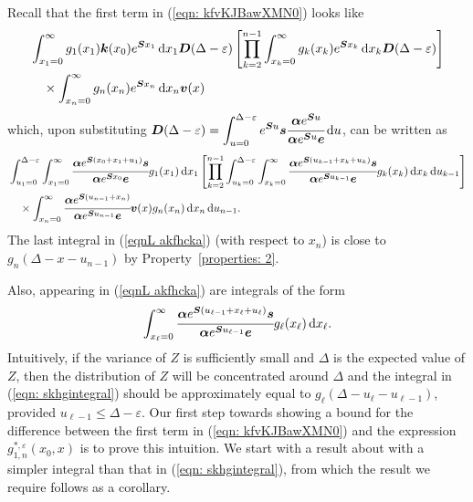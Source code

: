 	Recall that the first term in (\ref{eqn: kfvKJBawXMN0}) looks like 
	\begin{align}
		&\int_{x_1=0}^\infty g_1(x_1) \boldsymbol k(x_0)e^{\boldsymbol{S}x_1}\, \mathrm{d} x_1\boldsymbol D(\Delta-\varepsilon)
				\left[\prod_{k=2}^{n-1}\int_{x_k=0}^\infty g_k(x_k) e^{\boldsymbol{S}x_k} \, \mathrm{d} x_k \boldsymbol D(\Delta-\varepsilon)\right] \nonumber 
				\\&\quad \times\int_{x_n=0}^\infty g_{n}(x_n) e^{\boldsymbol{S}x_n} \, \mathrm{d} x_n {\boldsymbol v}(x)  
	\end{align}
	which, upon substituting \(\boldsymbol D(\Delta-\varepsilon)=\displaystyle \int_{u=0}^{\Delta-\varepsilon}e^{\boldsymbol Su}\boldsymbol s\cfrac{\boldsymbol \alpha e^{\boldsymbol Su}}{\boldsymbol \alpha e^{\boldsymbol Su}\boldsymbol e}\, \mathrm{d} u \), can be written as 
	\begin{align}
		& \int_{u_1=0}^{\Delta-\varepsilon} \int_{x_1=0}^\infty \cfrac{\boldsymbol \alpha e^{\boldsymbol{S}(x_{0}+x_1+u_1)}\boldsymbol s}{\boldsymbol \alpha e^{\boldsymbol{S}x_0}\boldsymbol e}g_1(x_1) \, \mathrm{d} x_1 \nonumber 
		\left[\prod_{k=2}^{n-1}\int_{u_k=0}^{\Delta-\varepsilon} \int_{x_k=0}^\infty \cfrac{\boldsymbol \alpha e^{\boldsymbol{S}(u_{k-1}+x_k+u_k)}\boldsymbol s}{\boldsymbol \alpha e^{\boldsymbol{S}u_{k-1}}\boldsymbol e}g_k(x_k) \, \mathrm{d} x_k \, \mathrm{d} u_{k-1} \right]
            	\\&{}\quad\times\int_{x_n=0}^\infty \cfrac{\boldsymbol \alpha e^{\boldsymbol{S}(u_{n-1}+x_n )}}{\boldsymbol \alpha e^{\boldsymbol{S}u_{n-1}}\boldsymbol e} {\boldsymbol v}(x)g_{n}(x_n)\, \mathrm{d} x_n \, \mathrm{d} u_{n-1} .\label{eqnL akfhcka}
	\end{align}
	The last integral in (\ref{eqnL akfhcka}) (with respect to \(x_n\)) is close to \(g_n(\Delta - x-u_{n-1})\) by Property~\ref{properties: 2}.

	Also, appearing in (\ref{eqnL akfhcka}) are integrals of the form
	\begin{align}
		\int_{x_\ell=0}^\infty \cfrac{\boldsymbol \alpha e^{\boldsymbol{S}(u_{\ell-1}+x_\ell+u_\ell)}\boldsymbol s}{\boldsymbol \alpha e^{\boldsymbol{S}u_{\ell-1}}\boldsymbol e}g_\ell(x_\ell) \, \mathrm{d} x_\ell. \label{eqn: skhgintegral}
	\end{align}
	Intuitively, if the variance of \(Z\) is sufficiently small and \(\Delta\) is the expected value of \(Z\), then the distribution of \(Z\) will be concentrated around \(\Delta\) and the integral in (\ref{eqn: skhgintegral}) should be approximately equal to \(g_{\ell}(\Delta - u_{\ell}-u_{\ell-1})\), provided \(u_{\ell-1}\leq \Delta-\varepsilon\). Our first step towards showing a bound for the difference between the first term in (\ref{eqn: kfvKJBawXMN0}) and the expression \(g^{*,\varepsilon}_{1,n}(x_0,x)\) is to prove this intuition. We start with a result about with a simpler integral than that in (\ref{eqn: skhgintegral}), from which the result we require follows as a corollary. 

